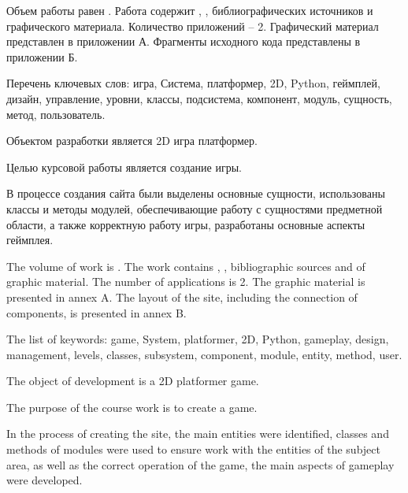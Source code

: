 
Объем работы равен . Работа содержит , ,  библиографических источников и  графического материала. Количество приложений – 2. Графический материал представлен в приложении А. Фрагменты исходного кода представлены в приложении Б.

Перечень ключевых слов: игра, Система, платформер, 2D, Python, геймплей, дизайн, управление, уровни, классы, подсистема, компонент, модуль, сущность, метод, пользователь.

Объектом разработки является 2D игра платформер.

Целью курсовой работы является создание игры.

В процессе создания сайта были выделены основные сущности, использованы классы и методы модулей, обеспечивающие работу с сущностями предметной области, а также корректную работу игры, разработаны основные аспекты геймплея.


  
The volume of work is . The work contains , ,  bibliographic sources and  of graphic material. The number of applications is 2. The graphic material is presented in annex A. The layout of the site, including the connection of components, is presented in annex B.

The list of keywords: game, System, platformer, 2D, Python, gameplay, design, management, levels, classes, subsystem, component, module, entity, method, user.

The object of development is a 2D platformer game.

The purpose of the course work is to create a game.

In the process of creating the site, the main entities were identified, classes and methods of modules were used to ensure work with the entities of the subject area, as well as the correct operation of the game, the main aspects of gameplay were developed.
